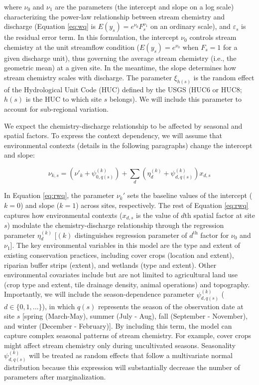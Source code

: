 \documentclass[12pt, class=article, crop=false]{standalone}
\begin{document}
where $\nu_0$ and $\nu_1$ are the parameters (the intercept and slope on a log scale) characterizing the power-law relationship between stream chemistry and discharge \citep{wymore_revisiting_2023, pohle_framework_2021, rose_concentrationdischarge_2018} (Equation \ref{eq:wq} is $E(y_s) = e^{\nu_0}F_s^{\nu_1}$ on an ordinary scale), and $\varepsilon_s$ is the residual error term.
In this formulation, the intercept $\nu_0$ controls stream chemistry at the unit streamflow condition ($E(y_s) = e^{\nu_0}$ when $F_s = 1$ for a given discharge unit), thus governing the average stream chemistry (i.e., the geometric mean) at a given site.
In the meantime, the slope determines how stream chemistry scales with discharge. The parameter $\xi_{h(s)}$ is the random effect of the Hydrological Unit Code (HUC) defined by the USGS (HUC6 or HUC8; $h(s)$ is the HUC to which site $s$ belongs).
We will include this parameter to account for sub-regional variation.

We expect the chemistry-discharge relationship to be affected by seasonal and spatial factors.
To express the context dependency, we will assume that environmental contexts (details in the following paragraphs) change the intercept and slope:

\begin{equation}\label{eq:rwq}
\nu_{k, s} = (\nu'_k + \psi^{(k)}_{0,q(s)}) + \sum_d (\eta^{(k)}_d + \psi^{(k)}_{d,q(s)}) x_{d,s}
\end{equation}

In Equation \ref{eq:rwq}, the parameter $\nu_k'$ sets the baseline values of the intercept ($k=0$) and slope ($k=1$) across sites, respectively.
The rest of Equation \ref{eq:rwq} captures how environmental contexts ($x_{d,s}$ is the value of $d$th spatial factor at site $s$) modulate the chemistry-discharge relationship through the regression parameter $\eta^{(k)}_d$ [$(k)$ distinguishes regression parameter of $d^{\text{th}}$ factor for $\nu_0$ and $\nu_1$].
The key environmental variables in this model are the type and extent of existing conservation practices, including cover crops (location and extent), riparian buffer strips (extent), and wetlands (type and extent).
Other environmental covariates include but are not limited to agricultural land use (crop type and extent, tile drainage density, animal operations) and topography.
Importantly, we will include the season-dependence parameter $\psi^{(k)}_{d,q(s)}$ ($d \in \{0, 1,...\}$), in which $q(s)$ represents the season of the observation date at site $s$ [spring (March-May), summer (July - Aug), fall (September - November), and winter (December - February)].
By including this term, the model can capture complex seasonal patterns of stream chemistry.
For example, cover crops might affect stream chemistry only during uncultivated seasons.
Seasonality $\psi^{(k)}_{d,q(s)}$ will be treated as random effects that follow a multivariate normal distribution because this expression will substantially decrease the number of parameters after marginalization.
\end{document}
